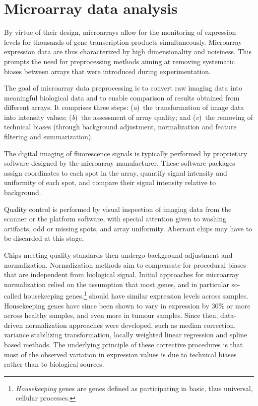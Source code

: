\section{Microarray data analysis}
\label{sec:microarray-methods-analysis}

By virtue of their design, microarrays allow for the monitoring of expression
levels for thousands of gene transcription products simultaneously.  Microarray
expression data are thus characterized by high dimensionality and noisiness.
This prompts the need for preprocessing methods aiming at removing systematic
biases between arrays that were introduced during
experimentation.\cite{shakya_comparison_2010}

The goal of microarray data preprocessing is to convert raw imaging data into
meaningful biological data and to enable comparison of results obtained from
different arrays.  It comprises three steps: (\emph{a})~the transformation of
image data into intensity values; (\emph{b})~the assessment of array quality;
and (\emph{c})~the removing of technical biases (through background adjustment,
normalization and feature filtering and summarization).

The digital imaging of fluorescence signals is typically performed by
proprietary software designed by the microarray manufacturer.  These software
packages assign coordinates to each spot in the array, quantify signal intensity
and uniformity of each spot, and compare their signal intensity relative to
background.

Quality control is performed by visual inspection of imaging data from the
scanner or the platform software, with special attention given to washing
artifacts, odd or missing spots, and array uniformity.  Aberrant chips may have
to be discarded at this stage.

Chips meeting quality standards then undergo background adjustment and
normalization.  Normalization methods aim to compensate for procedural biases
that are independent from biological signal.  Initial approaches for microarray
normalization relied on the assumption that most genes, and in particular
so-called housekeeping genes,\footnote{\emph{Housekeeping} genes are genes
  defined as participating in basic, thus universal, cellular processes.}
should have similar expression levels across samples.  Housekeeping genes have
since been shown to vary in expression by 30\% or more across healthy samples,
and even more in tumour samples.\cite{lee_control_2002,eisenberg_human_2003}
Since then, data-driven normalization approaches were developed, such as median
correction,\cite{cho_genome-wide_1998,selinger_rna_2000} variance stabilizing
transformation,\cite{durbin_variance-stabilizing_2002} locally weighted linear
regression\cite{yang_normalization_2002} and spline based
methods.\cite{workman_new_2002} The underlying principle of these corrective
procedures is that most of the observed variation in expression values is due to
technical biases rather than to biological sources.\cite{hicks_when_2014}

